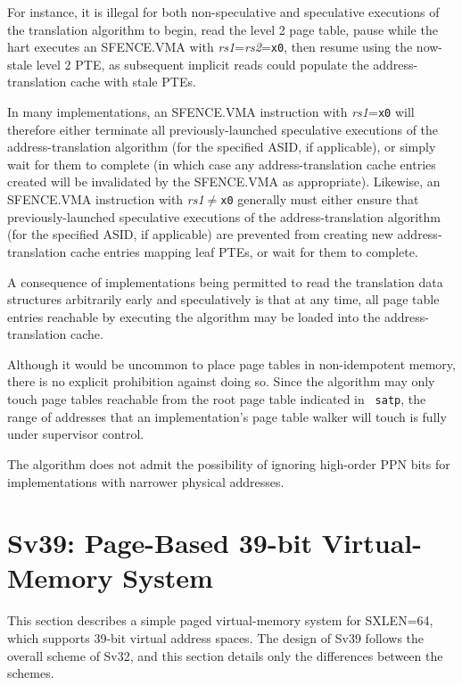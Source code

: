 \begin{commentary}
  For instance, it is illegal for both non-speculative and speculative
  executions of the translation algorithm to begin, read the level 2 page table,
  pause while the hart executes an SFENCE.VMA with {\em rs1}={\em rs2}={\tt x0},
  then resume using the now-stale level 2 PTE, as subsequent implicit reads
  could populate the address-translation cache with stale PTEs.

  In many implementations, an SFENCE.VMA instruction with {\em rs1}={\tt x0}
  will therefore either terminate all previously-launched speculative
  executions of the address-translation algorithm (for the specified ASID, if
  applicable), or simply wait for them to complete (in which case any
  address-translation cache entries created will be invalidated by the
  SFENCE.VMA as appropriate).  Likewise, an SFENCE.VMA instruction with {\em
  rs1}$\neq${\tt x0} generally must either ensure that previously-launched
  speculative executions of the address-translation algorithm (for the specified
  ASID, if applicable) are prevented from creating new address-translation cache
  entries mapping leaf PTEs, or wait for them to complete.

  A consequence of implementations being permitted to read the translation data
  structures arbitrarily early and speculatively is that at any time, all
  page table entries reachable by executing the algorithm may be loaded into
  the address-translation cache.

  Although it would be uncommon to place page tables in non-idempotent memory,
  there is no explicit prohibition against doing so.  Since the algorithm may
  only touch page tables reachable from the root page table indicated in {\tt
  satp}, the range of addresses that an implementation's page table walker will
  touch is fully under supervisor control.
\end{commentary}

\begin{commentary}
The algorithm does not admit the possibility of ignoring high-order PPN bits
for implementations with narrower physical addresses.
\end{commentary}

\section{Sv39: Page-Based 39-bit Virtual-Memory System}
\label{sec:sv39}

This section describes a simple paged virtual-memory system
for SXLEN=64, which supports 39-bit virtual address spaces.  The
design of Sv39 follows the overall scheme of Sv32, and this section
details only the differences between the schemes.

